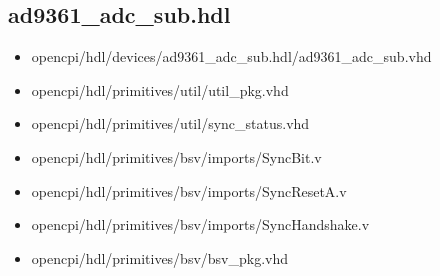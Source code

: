 \documentclass{article}
\def\comp{ad9361\_adc\_sub}
\begin{document}
\subsection*{\comp.hdl}
\begin{itemize}
	\item opencpi/hdl/devices/ad9361\_adc\_sub.hdl/ad9361\_adc\_sub.vhd
	\item opencpi/hdl/primitives/util/util\_pkg.vhd
	\item opencpi/hdl/primitives/util/sync\_status.vhd
	\item opencpi/hdl/primitives/bsv/imports/SyncBit.v
	\item opencpi/hdl/primitives/bsv/imports/SyncResetA.v
	\item opencpi/hdl/primitives/bsv/imports/SyncHandshake.v
	\item opencpi/hdl/primitives/bsv/bsv\_pkg.vhd
\end{itemize}
\end{document}
